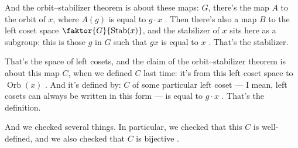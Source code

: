 \begin{speech}[00:00:58 - 00:02:28]
And the orbit--stabilizer theorem is about these maps: $G$, there's the map $A$ to the orbit of $x$, where $A(g)$ is equal to $g \cdot x$ . Then there's also a map $B$ to the left coset space $\faktor{G}{\operatorname{Stab}(x)}$, and the stabilizer of $x$ sits here as a subgroup: this is those $g$ in $G$ such that $g x$ is equal to $x$ . That's the stabilizer.

That's the space of left cosets, and the claim of the orbit--stabilizer theorem is about this map $C$, when we defined $C$ last time: it's from this left coset space to $\operatorname{Orb}(x)$ . And it's defined by: $C$ of some particular left coset --- I mean, left cosets can always be written in this form --- is equal to $g \cdot x$ . That's the definition.

And we checked several things. In particular, we checked that this $C$ is well-defined, and we also checked that $C$ is bijective .
\end{speech}

